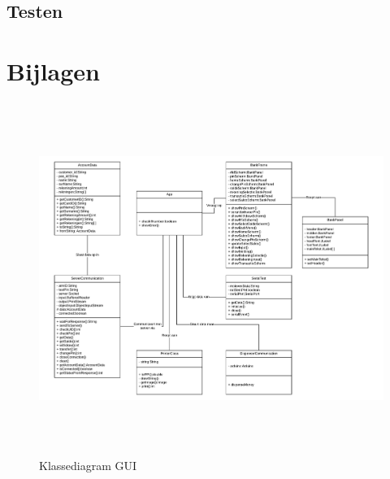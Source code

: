 \documentclass{article}
\begin{document}

\subsection{Testen}


\newpage
\section{Bijlagen}

\begin{figure}[H]
       \centering
       \includegraphics[height=4.5in]{Klassediagram.pdf}
       \caption{Klassediagram GUI}
       \label{fig: Klassediagram GUI}
\end{figure}
\end{document}
